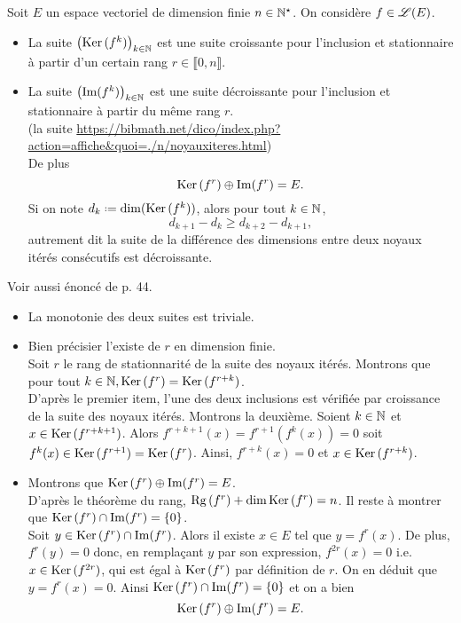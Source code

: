 \begin{prop}{}
    Soit $E$ un espace vectoriel de dimension finie $n \in \mathbb{N}^\star$. On considère $f \in \mathscr{L}(E)$.
    \begin{itemize}
        \item La suite $\left( \mathrm{Ker}\,(f^k) \right)_{k \in \mathbb{N}}$ est une suite croissante pour l'inclusion et stationnaire à partir d'un certain rang $r \in \llbracket 0, n \rrbracket$.
        \item La suite $\left( \Im(f^k) \right)_{k \in \mathbb{N}}$ est une suite décroissante pour l'inclusion et stationnaire à partir du même rang $r$. \\
        (la suite \url{https://bibmath.net/dico/index.php?action=affiche&quoi=./n/noyauxiteres.html}) \\De plus
        $$\mathrm{Ker}\,(f^r) \oplus \Im(f^r) = E.$$
        Si on note $d_k \defeq \dim(\Ker(f^k))$, alors pour tout $k \in \mathbb{N}$, 
        $$d_{k+1} - d_k \geqslant d_{k+2} - d_{k+1},$$
        autrement dit la suite de la différence des dimensions entre deux noyaux itérés consécutifs est décroissante. 
    \end{itemize}
\end{prop} 

Voir aussi énoncé de \cite{exos_oraux} p. 44.

\begin{preuve}
    \begin{itemize}
        \item La monotonie des deux suites est triviale. 
        \item Bien précisier l'existe de $r$ en dimension finie. \\
        Soit $r$ le rang de stationnarité de la suite des noyaux itérés. Montrons que pour tout $k \in \mathbb{N}, \mathrm{Ker}\,(f^r) = \mathrm{Ker}\,(f^{r+k})$. \\
        D'après le premier item, l'une des deux inclusions est vérifiée par croissance de la suite des noyaux itérés. Montrons la deuxième. Soient $k \in \mathbb{N}$ et $x \in \mathrm{Ker}\,(f^{r+k+1})$. Alors $f^{r+k+1}(x) = f^{r+1}(f^k(x)) = 0$ soit $f^k(x) \in \mathrm{Ker}\,(f^{r+1}) = \mathrm{Ker}\,(f^r)$. Ainsi, $f^{r+k}(x) = 0$ et $x \in \mathrm{Ker}\,(f^{r+k})$.
        \item Montrons que $\mathrm{Ker}\,(f^r) \oplus \Im(f^r) = E$. \\
        D'après le théorème du rang, $\mathrm{Rg}\,(f^r) + \dim \mathrm{Ker}\,(f^r) = n$. Il reste à montrer que $\mathrm{Ker}\,(f^r) \cap \Im(f^r) = \{ 0 \}$. \\
        Soit $y \in \mathrm{Ker}\,(f^r) \cap \Im(f^r)$. Alors il existe $x \in E$ tel que $y = f^r(x)$. De plus, $f^r(y) = 0$ donc, en remplaçant $y$ par son expression, $f^{2r}(x) = 0$ i.e. $x \in \mathrm{Ker}\,(f^{2r})$, qui est égal à $\mathrm{Ker}\,(f^r)$ par définition de $r$. On en déduit que $y = f^r(x) = 0$. Ainsi $\mathrm{Ker}\,(f^r) \cap \Im(f^r) = \{ 0 \}$ et on a bien
        $$\mathrm{Ker}\,(f^r) \oplus \Im(f^r) = E.$$
    \end{itemize}
\end{preuve}

